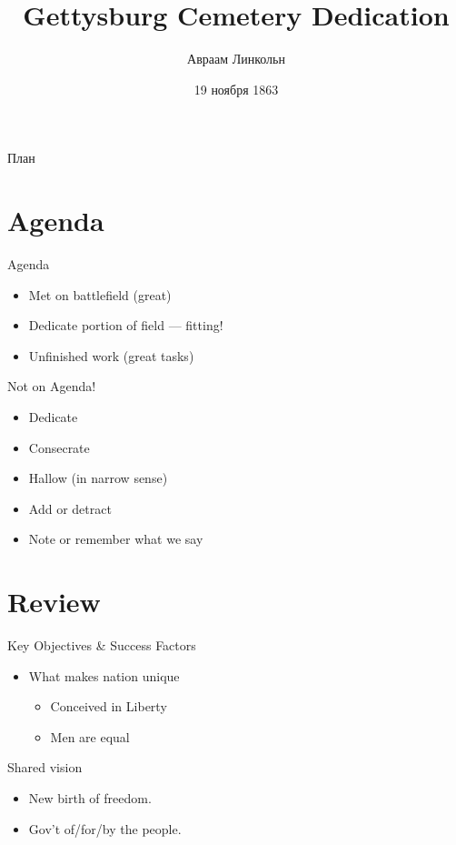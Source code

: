 \documentclass{beamer}
\title{Gettysburg Cemetery Dedication}
\author{Авраам Линкольн}
\institute[США]{Соединённые Штаты Америки}
\date{19 ноября 1863}
\begin{document}
\begin{frame}
  \titlepage
\end{frame}

\begin{frame}{План}
  \tableofcontents
\end{frame}

\section{Agenda}

\begin{frame}{Agenda}

\begin{itemize}
  \item Met on battlefield (great)
  \item Dedicate portion of field --- fitting!
  \item Unfinished work (great tasks)
\end{itemize}

\end{frame}

\begin{frame}{Not on Agenda!}

\begin{itemize}[<+->]
  \item Dedicate
  \item Consecrate
  \item Hallow (in narrow sense)
  \item Add or detract
  \item Note or remember what we say
\end{itemize}

\end{frame}

\section{Review}

\begin{frame}{Key Objectives \& Success Factors}

\begin{itemize}
\item What makes nation unique
  \begin{itemize}
    \item Conceived in Liberty
    \item Men are equal
  \end{itemize}
\end{itemize}

\begin{block}{Shared vision}
\begin{itemize}
\item New birth of freedom.
\item Gov't of/for/by the people.
\end{itemize}
\end{block}

\end{frame}
\end{document}
